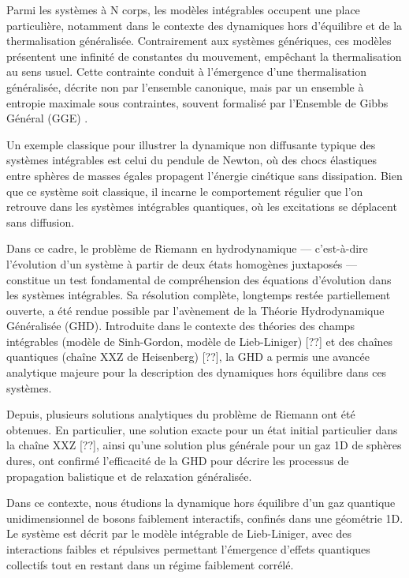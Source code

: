 Parmi les systèmes à N corps, les modèles intégrables occupent une place particulière, notamment dans le contexte des dynamiques hors d’équilibre et de la thermalisation généralisée. Contrairement aux systèmes génériques, ces modèles présentent une infinité de constantes du mouvement, empêchant la thermalisation au sens usuel. Cette contrainte conduit à l’émergence d’une thermalisation généralisée, décrite non par l’ensemble canonique, mais par un ensemble à entropie maximale sous contraintes, souvent formalisé par l’Ensemble de Gibbs Général (GGE) .

Un exemple classique pour illustrer la dynamique non diffusante typique des systèmes intégrables est celui du pendule de Newton, où des chocs élastiques entre sphères de masses égales propagent l’énergie cinétique sans dissipation. Bien que ce système soit classique, il incarne le comportement régulier que l’on retrouve dans les systèmes intégrables quantiques, où les excitations se déplacent sans diffusion.

Dans ce cadre, le problème de Riemann en hydrodynamique — c’est-à-dire l’évolution d’un système à partir de deux états homogènes juxtaposés — constitue un test fondamental de compréhension des équations d’évolution dans les systèmes intégrables. Sa résolution complète, longtemps restée partiellement ouverte, a été rendue possible par l’avènement de la Théorie Hydrodynamique Généralisée (GHD). Introduite dans le contexte des théories des champs intégrables (modèle de Sinh-Gordon, modèle de Lieb-Liniger) [??] et des chaînes quantiques (chaîne XXZ de Heisenberg) [??], la GHD a permis une avancée analytique majeure pour la description des dynamiques hors équilibre dans ces systèmes.

Depuis, plusieurs solutions analytiques du problème de Riemann ont été obtenues. En particulier, une solution exacte pour un état initial particulier dans la chaîne XXZ [??], ainsi qu’une solution plus générale pour un gaz 1D de sphères dures, ont confirmé l’efficacité de la GHD pour décrire les processus de propagation balistique et de relaxation généralisée.

Dans ce contexte, nous étudions la dynamique hors équilibre d’un gaz quantique unidimensionnel de bosons faiblement interactifs, confinés dans une géométrie 1D. Le système est décrit par le modèle intégrable de Lieb-Liniger, avec des interactions faibles et répulsives permettant l’émergence d’effets quantiques collectifs tout en restant dans un régime faiblement corrélé.

